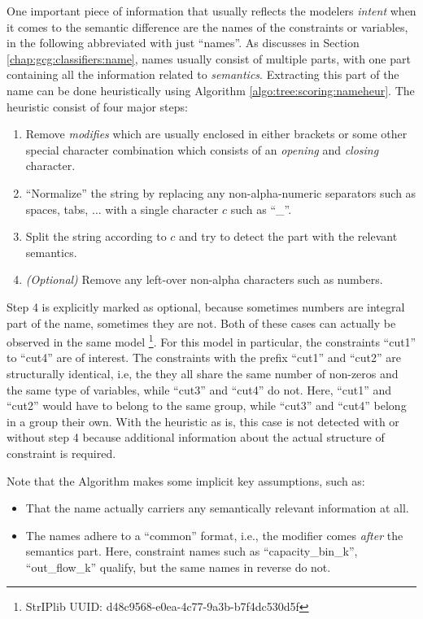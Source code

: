 			One important piece of information that usually reflects the modelers \textit{intent} when it comes to the semantic difference are the names of the constraints or variables, in the following abbreviated with just \enquote{names}.
			As discusses in Section \ref{chap:gcg:classifiers:name}, names usually consist of multiple parts, with one part containing all the information related to \textit{semantics}.
			Extracting this part of the name can be done heuristically using Algorithm \ref{algo:tree:scoring:nameheur}.
			The heuristic consist of four major steps:
			\begin{enumerate}
				\item Remove \textit{modifies} which are usually enclosed in either brackets or some other special character combination which consists of an \textit{opening} and \textit{closing} character.
				\item \enquote{Normalize} the string by replacing any non-alpha-numeric separators such as spaces, tabs, $\ldots$ with a single character $c$ such as \enquote{\_}.
				\item Split the string according to $c$ and try to detect the part with the relevant semantics.
				\item \textit{(Optional)} Remove any left-over non-alpha characters such as numbers.
			\end{enumerate}

			Step 4 is explicitly marked as optional, because sometimes numbers are integral part of the name, sometimes they are not.
			Both of these cases can actually be observed in the same model \footnote{StrIPlib UUID: d48c9568-e0ea-4c77-9a3b-b7f4dc530d5f}.
			For this model in particular, the constraints \enquote{cut1} to \enquote{cut4} are of interest.
			The constraints with the prefix \enquote{cut1} and \enquote{cut2} are structurally identical, i.e, the they all share the same number of non-zeros and the same type of variables, while \enquote{cut3} and \enquote{cut4} do not.
			Here, \enquote{cut1} and \enquote{cut2} would have to belong to the same group, while \enquote{cut3} and \enquote{cut4} belong in a group their own.
			With the heuristic as is, this case is not detected with or without step 4 because additional information about the actual structure of constraint is required.

			Note that the Algorithm makes some implicit key assumptions, such as:
			\begin{itemize}
				\item That the name actually carriers any semantically relevant information at all.
				\item The names adhere to a \enquote{common} format, i.e., the modifier comes \textit{after} the semantics part. Here, constraint names such as \enquote{capacity\_bin\_k}, \enquote{out\_flow\_k} qualify, but the same names in reverse do not.
			\end{itemize}

